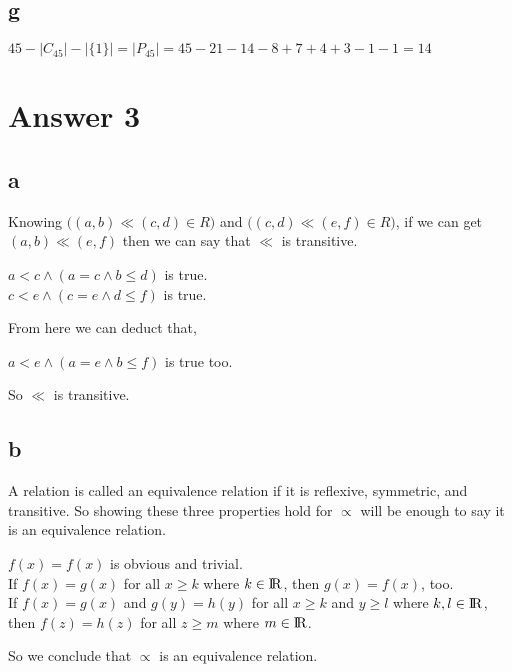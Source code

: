 \documentclass[12pt]{article}
\begin{document}
\subsection*{g}
\begin{center}
    $45 - |C_{45}| - |\{1\}| = |P_{45}| = 45 - 21 - 14 - 8 + 7 + 4 + 3 - 1 - 1 = 14$
\end{center}
\section*{Answer 3}
\subsection*{a}
Knowing $\big((a, b) \ll (c, d) \in R\big)$ and $\big((c, d) \ll (e, f) \in R\big)$, if we can get $(a, b) \ll (e, f)$ then we can say that $\ll$ is transitive.
\begin{center}
    $a<c \land (a=c \land b\leq d)$ is true.\\
    $c<e \land (c=e \land d\leq f)$ is true.
\end{center}
From here we can deduct that,
\begin{center}
    $a<e \land (a=e \land b\leq f)$ is true too.
\end{center}
So $\ll$ is transitive.
\subsection*{b}
A relation is called an equivalence relation if it is reflexive, symmetric, and transitive. So showing these three properties hold for $\propto$ will be enough to say it is an equivalence relation.\\
\begin{center}
    $f(x) = f(x)$ is obvious and trivial.\\
    \bigskip
    If $f(x) = g(x)$ for all $x\geq k$ where $k\in {\rm I\!R}$, then $g(x) = f(x)$, too.\\
    \bigskip
    If $f(x) = g(x)$ and $g(y) = h(y)$ for all $x\geq k$ and $y\geq l$ where $k,l\in{\rm I\!R}$, then $f(z) = h(z)$ for all $z\geq m$ where $m\in{\rm I\!R}$.
\end{center}
So we conclude that $\propto$ is an equivalence relation.
\end{document}

